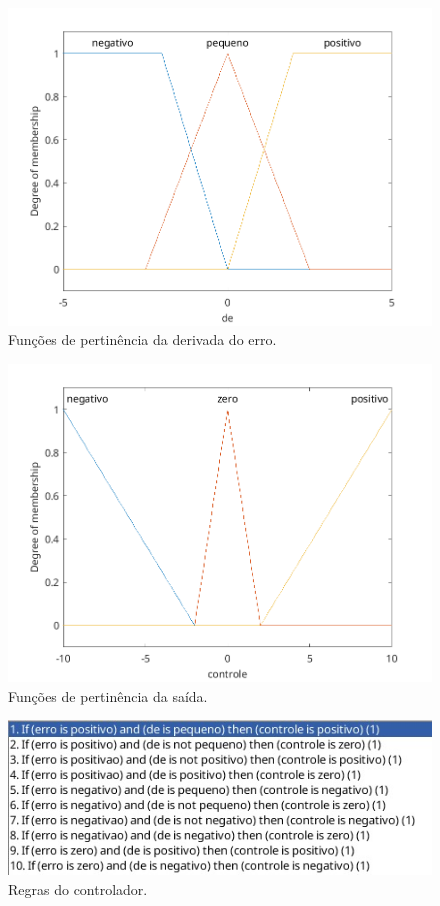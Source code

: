 \documentclass[12pt]{article}
\begin{document}
\begin{figure}
  \centering
  \includegraphics{fig/fuzzy_input_2.png}
  \caption{Funções de pertinência da derivada do erro.}
  \label{fig:input_2}
\end{figure}

\begin{figure}
  \centering
  \includegraphics{fig/fuzzy_output.png}
  \caption{Funções de pertinência da saída.}
  \label{fig:output}
\end{figure}

\begin{figure}
  \centering
  \includegraphics{fig/regras.jpeg}
  \caption{Regras do controlador.}
  \label{fig:regras}
\end{figure}
\end{document}
